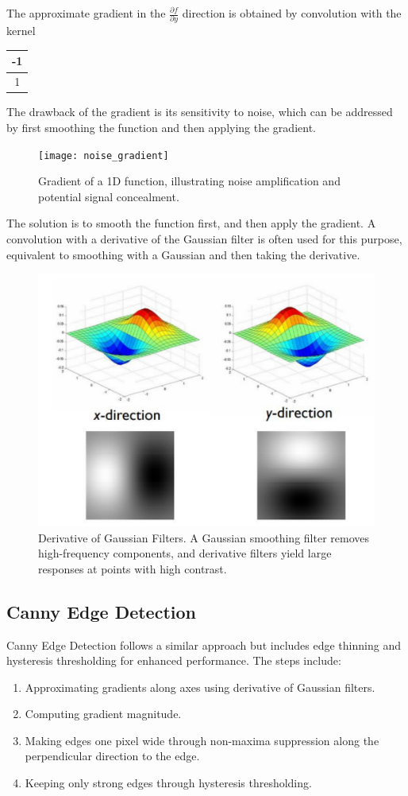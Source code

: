 The approximate gradient in the $ \frac{\partial f}{\partial y} $ direction is obtained by convolution with the kernel \begin{tabular}{|c|}
    \hline
    -1 \\
    \hline
    1\\
    \hline
\end{tabular}

The drawback of the gradient is its sensitivity to noise, which can be addressed by first smoothing the function and then applying the gradient.

\begin{figure}[H]
    \centering
    \texttt{[image: noise\_gradient]}
    \caption{Gradient of a 1D function, illustrating noise amplification and potential signal concealment.}
    \label{fig:noisegradient}
\end{figure}

The solution is to smooth the function first, and then apply the gradient.
A convolution with a derivative of the Gaussian filter is often used for this purpose,
equivalent to smoothing with a Gaussian and then taking the derivative.

\begin{figure}[H]
    \centering
    \includegraphics[width=0.6\linewidth]{img/derivative_gaussian_filter2}
    \caption{Derivative of Gaussian Filters. A Gaussian smoothing filter removes high-frequency components,
	and derivative filters yield large responses at points with high contrast.}
    \label{fig:derivativegaussianfilter2}
\end{figure}

\subsection{Canny Edge Detection}
Canny Edge Detection follows a similar approach but includes edge thinning and hysteresis thresholding for enhanced performance.
The steps include:
\begin{enumerate}
    \item Approximating gradients along axes using derivative of Gaussian filters.
    \item Computing gradient magnitude.
    \item Making edges one pixel wide through non-maxima suppression along the perpendicular direction to the edge.
    \item Keeping only strong edges through hysteresis thresholding.
\end{enumerate}

